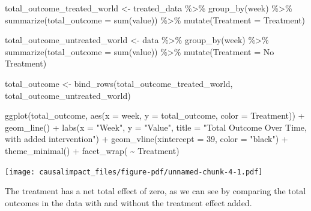 \documentclass[
  letterpaper,
  DIV=11,
  numbers=noendperiod]{scrreprt}
\newenvironment{Shaded}{\begin{snugshade}}{\end{snugshade}}
\newcommand{\AttributeTok}[1]{\textcolor[rgb]{0.40,0.45,0.13}{#1}}
\newcommand{\DecValTok}[1]{\textcolor[rgb]{0.68,0.00,0.00}{#1}}
\newcommand{\FunctionTok}[1]{\textcolor[rgb]{0.28,0.35,0.67}{#1}}
\newcommand{\NormalTok}[1]{\textcolor[rgb]{0.00,0.23,0.31}{#1}}
\newcommand{\OtherTok}[1]{\textcolor[rgb]{0.00,0.23,0.31}{#1}}
\newcommand{\SpecialCharTok}[1]{\textcolor[rgb]{0.37,0.37,0.37}{#1}}
\newcommand{\StringTok}[1]{\textcolor[rgb]{0.13,0.47,0.30}{#1}}
\begin{document}
\begin{Shaded}
\begin{Highlighting}[]
\NormalTok{total\_outcome\_treated\_world }\OtherTok{\textless{}{-}}\NormalTok{ treated\_data }\SpecialCharTok{\%\textgreater{}\%} \FunctionTok{group\_by}\NormalTok{(week) }\SpecialCharTok{\%\textgreater{}\%}
  \FunctionTok{summarize}\NormalTok{(}\AttributeTok{total\_outcome =} \FunctionTok{sum}\NormalTok{(value)) }\SpecialCharTok{\%\textgreater{}\%} \FunctionTok{mutate}\NormalTok{(}\AttributeTok{Treatment =} \StringTok{\textquotesingle{}Treatment\textquotesingle{}}\NormalTok{)}

\NormalTok{total\_outcome\_untreated\_world }\OtherTok{\textless{}{-}}\NormalTok{ data }\SpecialCharTok{\%\textgreater{}\%} \FunctionTok{group\_by}\NormalTok{(week) }\SpecialCharTok{\%\textgreater{}\%}
  \FunctionTok{summarize}\NormalTok{(}\AttributeTok{total\_outcome =} \FunctionTok{sum}\NormalTok{(value)) }\SpecialCharTok{\%\textgreater{}\%} \FunctionTok{mutate}\NormalTok{(}\AttributeTok{Treatment =} \StringTok{\textquotesingle{}No Treatment\textquotesingle{}}\NormalTok{)}


\NormalTok{total\_outcome }\OtherTok{\textless{}{-}}
  \FunctionTok{bind\_rows}\NormalTok{(total\_outcome\_treated\_world, total\_outcome\_untreated\_world)}

\FunctionTok{ggplot}\NormalTok{(total\_outcome, }\FunctionTok{aes}\NormalTok{(}\AttributeTok{x =}\NormalTok{ week, }\AttributeTok{y =}\NormalTok{ total\_outcome, }\AttributeTok{color =}\NormalTok{ Treatment)) }\SpecialCharTok{+}
  \FunctionTok{geom\_line}\NormalTok{() }\SpecialCharTok{+}
  \FunctionTok{labs}\NormalTok{(}\AttributeTok{x =} \StringTok{"Week"}\NormalTok{, }\AttributeTok{y =} \StringTok{"Value"}\NormalTok{, }\AttributeTok{title =} \StringTok{"Total Outcome Over Time, with added intervention"}\NormalTok{) }\SpecialCharTok{+}
  \FunctionTok{geom\_vline}\NormalTok{(}\AttributeTok{xintercept =} \DecValTok{39}\NormalTok{, }\AttributeTok{color =} \StringTok{"black"}\NormalTok{) }\SpecialCharTok{+}
  \FunctionTok{theme\_minimal}\NormalTok{() }\SpecialCharTok{+}
  \FunctionTok{facet\_wrap}\NormalTok{( }\SpecialCharTok{\textasciitilde{}}\NormalTok{ Treatment)}
\end{Highlighting}
\end{Shaded}

\texttt{[image: causalimpact\_files/figure-pdf/unnamed-chunk-4-1.pdf]}

The treatment has a net total effect of zero, as we can see by comparing
the total outcomes in the data with and without the treatment effect
added.
\end{document}
